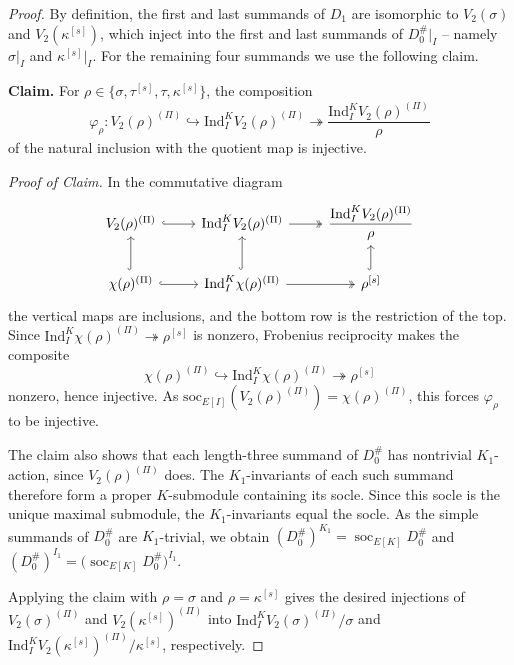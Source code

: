\documentclass[a4paper,10pt,twoside]{amsart}
\theoremstyle{definition}
\numberwithin{equation}{section}
\begin{document}
\begin{proof}
By definition, the first and last summands of $D_1$ are isomorphic to $V_2(\sigma)$ and $V_2(\kappa^{[s]})$, which inject into the first and last summands of $D_0^\#|_I$ -- namely $\sigma|_I$ and $\kappa^{[s]}|_I$. For the remaining four summands we use the following claim.

\medskip
\noindent\textbf{Claim.} For $\rho \in \{\sigma, \tau^{[s]}, \tau, \kappa^{[s]}\}$, the composition
\[
\varphi_\rho : V_2(\rho)^{(\Pi)} \hookrightarrow
\mathrm{Ind}_I^K V_2(\rho)^{(\Pi)}
\twoheadrightarrow
\frac{\mathrm{Ind}_I^K V_2(\rho)^{(\Pi)}}{\rho}
\]
of the natural inclusion with the quotient map is injective.

\medskip
\noindent\textit{Proof of Claim.}
In the commutative diagram
\[
\begin{tikzcd}
V_2(\rho)^{(\Pi)} \arrow[hook]{r}
& \mathrm{Ind}_I^K V_2(\rho)^{(\Pi)} \arrow[two heads]{r}
& \dfrac{\mathrm{Ind}_I^K V_2(\rho)^{(\Pi)}}{\rho} \\
\chi(\rho)^{(\Pi)} \arrow[hook]{u} \arrow[hook]{r}
& \mathrm{Ind}_I^K \chi(\rho)^{(\Pi)} \arrow[hook]{u} \arrow[two heads]{r}
& \rho^{[s]} \arrow[hook]{u}
\end{tikzcd}
\]
the vertical maps are inclusions, and the bottom row is the restriction of the top. 
Since $\mathrm{Ind}_I^K \chi(\rho)^{(\Pi)} \twoheadrightarrow \rho^{[s]}$ is nonzero, Frobenius reciprocity makes the composite 
\[\chi(\rho)^{(\Pi)} \hookrightarrow \mathrm{Ind}_I^K\chi(\rho)^{(\Pi)} \twoheadrightarrow \rho^{[s]}\]
nonzero, hence injective. As $\mathrm{soc}_{E[I]}(V_2(\rho)^{(\Pi)}) = \chi(\rho)^{(\Pi)}$, this forces $\varphi_\rho$ to be injective.

\medskip
The claim also shows that each length-three summand of
\(D_0^\#\) has nontrivial \(K_1\)-action, since
\(V_2(\rho)^{(\Pi)}\) does. The \(K_1\)-invariants of each such
summand therefore form a proper \(K\)-submodule containing its
socle. Since this socle is the unique maximal submodule, the
\(K_1\)-invariants equal the socle. As the simple summands of \(D_0^\#\) are \(K_1\)-trivial, we obtain $(D_0^\#)^{K_1}=\operatorname{soc}_{E[K]}D_0^\#$ and $(D_0^\#)^{I_1}=\bigl(\operatorname{soc}_{E[K]}D_0^\#\bigr)^{I_1}$.

Applying the claim with \(\rho=\sigma\) and
\(\rho=\kappa^{[s]}\) gives the desired injections of
\(V_2(\sigma)^{(\Pi)}\) and \(V_2(\kappa^{[s]})^{(\Pi)}\)
into \(\mathrm{Ind}_I^K V_2(\sigma)^{(\Pi)}/\sigma\) and
\(\mathrm{Ind}_I^K V_2(\kappa^{[s]})^{(\Pi)}/\kappa^{[s]}\),
respectively.


\end{proof}
\end{document}
